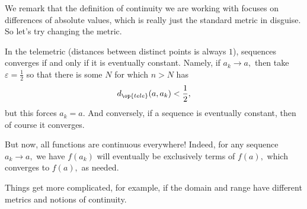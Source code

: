 We remark that the definition of continuity we are working with focuses on differences of absolute values, which is really just the standard metric in disguise. So let's try changing the metric.
\begin{example}
	In the telemetric (distances between distinct points is always $1$), sequences converges if and only if it is eventually constant. Namely, if $a_k\to a,$ then take $\varepsilon=\frac12$ so that there is some $N$ for which $n>N$ has
	\[d_{\op{tele}}(a,a_k)<\frac12,\]
	but this forces $a_k=a.$ And conversely, if a sequence is eventually constant, then of course it converges.

	But now, all functions are continuous everywhere! Indeed, for any sequence $a_k\to a,$ we have $f(a_k)$ will eventually be exclusively terms of $f(a),$ which converges to $f(a),$ as needed.
\end{example}
Things get more complicated, for example, if the domain and range have different metrics and notions of continuity.